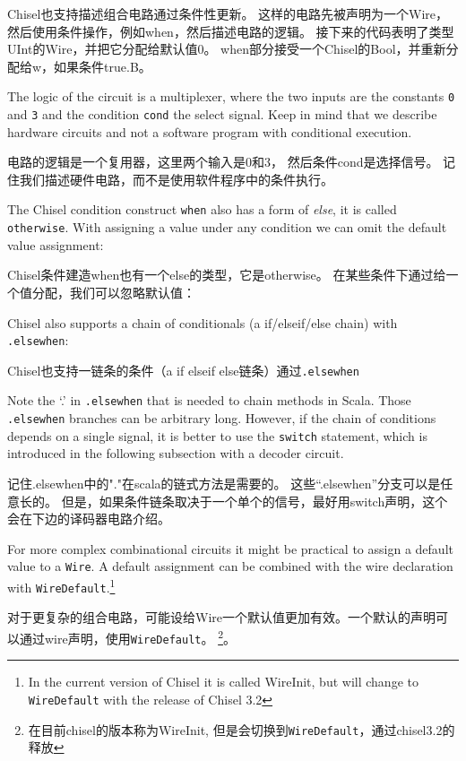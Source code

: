 \documentclass[%
    10pt,
    headinclude, footexclude,
    openright, %
    notitlepage,
    cleardoubleempty,
    headsepline,
    pointlessnumbers,
    bibtotoc, idxtotoc,
    ]{scrbook}
\newcommand{\code}[1]{{\small{\texttt{#1}}}}
\begin{document}
Chisel也支持描述组合电路通过条件性更新。
这样的电路先被声明为一个Wire，然后使用条件操作，例如when，然后描述电路的逻辑。
接下来的代码表明了类型UInt的Wire，并把它分配给默认值0。
when部分接受一个Chisel的Bool，并重新分配给w，如果条件true.B。


\noindent The logic of the circuit is a multiplexer, where the two inputs are the constants
\code{0} and \code{3} and the condition \code{cond} the select signal.
Keep in mind that we describe hardware circuits and not a software program with conditional
execution.

电路的逻辑是一个复用器，这里两个输入是0和3， 然后条件cond是选择信号。
记住我们描述硬件电路，而不是使用软件程序中的条件执行。

The Chisel condition construct \code{when} also has a form of \emph{else}, it is called
\code{otherwise}. With assigning a value under any condition we can omit the default
value assignment:

Chisel条件建造when也有一个else的类型，它是otherwise。
在某些条件下通过给一个值分配，我们可以忽略默认值：


Chisel also supports a chain of conditionals (a if/elseif/else chain) with \code{.elsewhen}:

Chisel也支持一链条的条件（a if elseif else链条）通过\code{.elsewhen}


Note the `.' in \code{.elsewhen} that is needed to chain methods in Scala.
Those \code{.elsewhen} branches can be arbitrary long.
However, if the chain of conditions depends on a single signal, it is better
to use the \code{switch} statement, which is introduced in the following
subsection with a decoder circuit.

记住.elsewhen中的"."在scala的链式方法是需要的。
这些“.elsewhen”分支可以是任意长的。
但是，如果条件链条取决于一个单个的信号，最好用switch声明，这个会在下边的译码器电路介绍。

For more complex combinational circuits it might be practical to assign
a default value to a \code{Wire}. A default assignment can be combined with the wire
declaration with \code{WireDefault}.\footnote{In the current version of Chisel
it is called WireInit, but will change to \code{WireDefault} with the release of Chisel 3.2}

对于更复杂的组合电路，可能设给Wire一个默认值更加有效。一个默认的声明可以通过wire声明，使用\code{WireDefault}。
\footnote{在目前chisel的版本称为WireInit, 但是会切换到\code{WireDefault}，通过chisel3.2的释放}。
\end{document}
